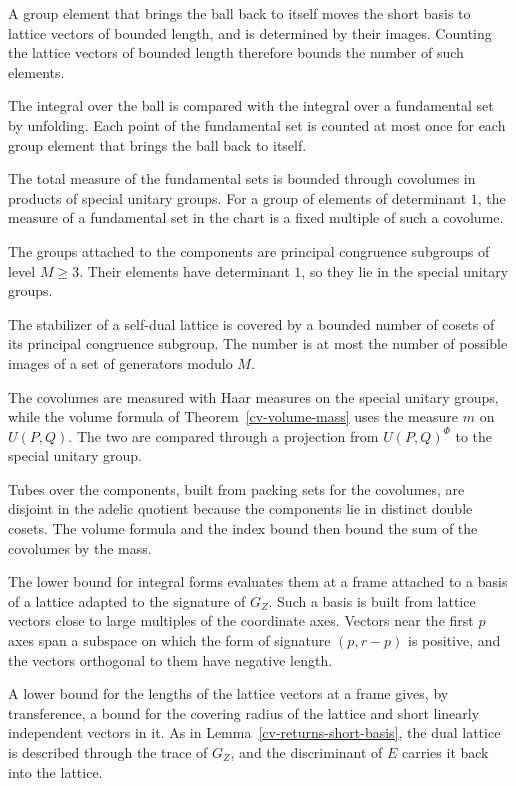 A group element that brings the ball back to itself moves the short basis to lattice vectors of bounded
length, and is determined by their images. Counting the lattice vectors of bounded length therefore
bounds the number of such elements.

The integral over the ball is compared with the integral over a fundamental set by unfolding. Each point of
the fundamental set is counted at most once for each group element that brings the ball back to itself.

The total measure of the fundamental sets is bounded through covolumes in products of special unitary
groups. For a group of elements of determinant $1$, the measure of a fundamental set in the chart is a fixed
multiple of such a covolume.

The groups attached to the components are principal congruence subgroups of level $M\ge3$. Their elements
have determinant $1$, so they lie in the special unitary groups.

The stabilizer of a self-dual lattice is covered by a bounded number of cosets of its principal congruence
subgroup. The number is at most the number of possible images of a set of generators modulo $M$.

The covolumes are measured with Haar measures on the special unitary groups, while the volume formula of
Theorem~\ref{cv-volume-mass} uses the measure $m$ on $U(P,Q)$. The two are compared through a projection
from $U(P,Q)^\Phi$ to the special unitary group.

Tubes over the components, built from packing sets for the covolumes, are disjoint in the adelic quotient
because the components lie in distinct double cosets. The volume formula and the index bound then bound
the sum of the covolumes by the mass.

The lower bound for integral forms evaluates them at a frame attached to a basis of a lattice adapted to the
signature of $G_Z$. Such a basis is built from lattice vectors close to large multiples of the coordinate
axes. Vectors near the first $p$ axes span a subspace on which the form of signature $(p,r-p)$ is positive,
and the vectors orthogonal to them have negative length.

A lower bound for the lengths of the lattice vectors at a frame gives, by transference, a bound for the
covering radius of the lattice and short linearly independent vectors in it. As in
Lemma~\ref{cv-returns-short-basis}, the dual lattice is described through the trace of $G_Z$, and the
discriminant of $E$ carries it back into the lattice.

